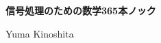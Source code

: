 \documentclass[10pt]{jsarticle}
\begin{document}
\begin{center}
  {\bf \Large 信号処理のための数学365本ノック}
\end{center}
\begin{flushright}
  Yuma Kinoshita
\end{flushright}
\setlength{\leftmarginii}{3pt}

\clearpage
\mbox{}\thispagestyle{empty}\newpage


\clearpage
\mbox{}\thispagestyle{empty}\newpage


\clearpage
\mbox{}\thispagestyle{empty}\newpage

\end{document}

